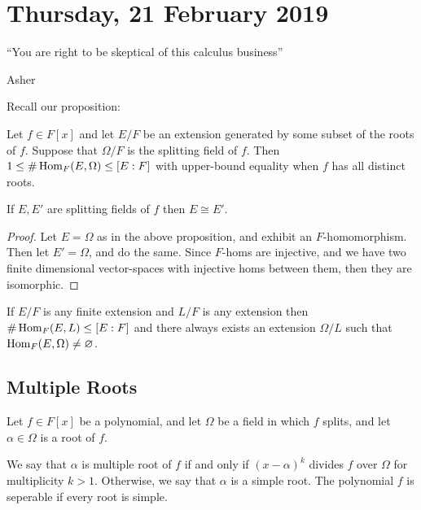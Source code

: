 
\section{Thursday, 21 February 2019}

\epigraph{``You are right to be skeptical of this calculus business''}{Asher}

Recall our proposition:

\begin{proposition}
Let $f \in F[x]$ and let $E/F$ be an extension generated by some subset of the roots of $f$. Suppose that $\Omega/F$ is the splitting field of $f$. Then $1 \leq \#\operatorname{Hom}_F(E,\Omega) \leq [E:F]$ with upper-bound equality when $f$ has all distinct roots.
\end{proposition}

\begin{corollary}
If $E,E'$ are splitting fields of $f$ then $E \cong E'$.
\end{corollary}

\begin{proof}
Let $E = \Omega$ as in the above proposition, and exhibit an $F$-homomorphism. Then let $E' = \Omega$, and do the same. Since $F$-homs are injective, and we have two finite dimensional vector-spaces with injective homs between them, then they are isomorphic.
\end{proof}

\begin{corollary}
If $E/F$ is any finite extension and $L/F$ is any extension then $\#\operatorname{Hom}_F(E,L) \leq [E:F]$ and there always exists an extension $\Omega/L$ such that $\operatorname{Hom}_F(E,\Omega) \not= \varnothing$.
\end{corollary}

\subsection{Multiple Roots}

Let $f \in F[x]$ be a polynomial, and let $\Omega$ be a field in which $f$ splits, and let $\alpha \in \Omega$ is a root of $f$.

\begin{definition}
We say that $\alpha$ is multiple root of $f$ if and only if $(x-\alpha)^k$ divides $f$ over $\Omega$ for multiplicity $k > 1$. Otherwise, we say that $\alpha$ is a simple root. The polynomial $f$ is seperable if every root is simple.
\end{definition}


